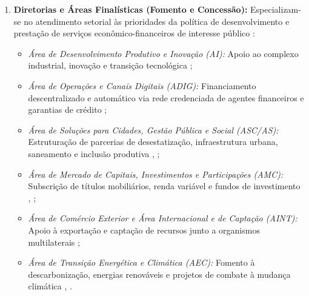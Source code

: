 \begin{enumerate}[label=\textbf{\arabic*.}]
    \item \textbf{Diretorias e Áreas Finalísticas (Fomento e Concessão):} Especializam-se no atendimento setorial às prioridades da política de desenvolvimento e prestação de serviços econômico-financeiros de interesse público \cite[arts.~6º e 7º]{bndes2025estatuto}:
          \begin{itemize}
              \item \emph{Área de Desenvolvimento Produtivo e Inovação (AI):} Apoio ao complexo industrial, inovação e transição tecnológica \cite[p.~43, 45]{bndes2026oib};
              \item \emph{Área de Operações e Canais Digitais (ADIG):} Financiamento descentralizado e automático via rede credenciada de agentes financeiros e garantias de crédito \cite[p.~54, 63, 70]{bndes2026oib};
              \item \emph{Área de Soluções para Cidades, Gestão Pública e Social (ASC/AS):} Estruturação de parcerias de desestatização, infraestrutura urbana, saneamento e inclusão produtiva \cite[art.~6º,~XII e XIII]{bndes2025estatuto}, \cite[p.~87, 118, 120]{bndes2026oib};
              \item \emph{Área de Mercado de Capitais, Investimentos e Participações (AMC):} Subscrição de títulos mobiliários, renda variável e fundos de investimento \cite[art.~43,~III, ``f'']{bndes2025estatuto}, \cite[p.~99--106]{bndes2026oib};
              \item \emph{Área de Comércio Exterior e Área Internacional e de Captação (AINT):} Apoio à exportação e captação de recursos junto a organismos multilaterais \cite[p.~10, 107--113]{bndes2026oib};
              \item \emph{Área de Transição Energética e Climática (AEC):} Fomento à descarbonização, energias renováveis e projetos de combate à mudança climática \cite[art.~6º,~X, ``b'']{bndes2025estatuto}, \cite[p.~111--112]{bndes2026oib}.
          \end{itemize}


\end{enumerate}
